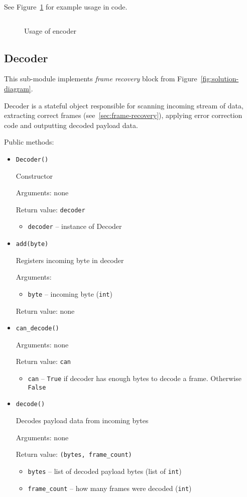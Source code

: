See Figure~\ref{fig:encoder-example} for example usage in code.

\begin{figure}[p]
\centering
\inputminted[linenos]{python}{listings/encoder_example.py}
\caption{Usage of encoder}
\label{fig:encoder-example}
\end{figure}

\subsection{Decoder}

This sub-module implements \emph{frame recovery} block from Figure~\ref{fig:solution-diagram}.

Decoder is a stateful object responsible for scanning incoming stream of data, extracting correct frames (see~\ref{sec:frame-recovery}), applying error correction code and outputting decoded payload data.

Public methods:

\begin{itemize}
\item \verb|Decoder()|

  Constructor

  Arguments: none

  Return value: \verb|decoder|
  \begin{itemize}
  \item \verb|decoder| -- instance of Decoder
  \end{itemize}

\item \verb|add(byte)|

  Registers incoming byte in decoder

  Arguments:
  \begin{itemize}
  \item \verb|byte| -- incoming byte (\verb|int|)
  \end{itemize}

  Return value: none

\item \verb|can_decode()|

  Arguments: none

  Return value: \verb|can|
  \begin{itemize}
  \item \verb|can| -- \verb|True| if decoder has enough bytes to decode a frame. Otherwise \verb|False|
  \end{itemize}

\item \verb|decode()|

  Decodes payload data from incoming bytes

  Arguments: none

  Return value: \verb|(bytes, frame_count)|
  \begin{itemize}
  \item \verb|bytes| -- list of decoded payload bytes (list of \verb|int|)
  \item \verb|frame_count| -- how many frames were decoded (\verb|int|)
  \end{itemize}
\end{itemize}

